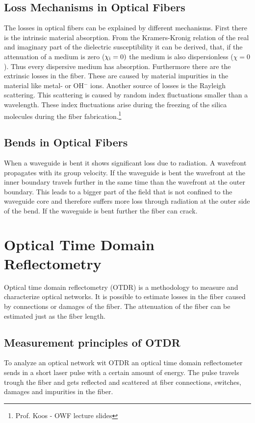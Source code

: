 \subsection{Loss Mechanisms in Optical Fibers}
\label{loss}
The losses in optical fibers can be explained by different mechanisms. First there is the intrinsic material absorption. From the Kramers-Kronig relation of the real and imaginary part of the dielectric susceptibility it can be derived, that, if the attenuation of a medium is zero ($\chi_{\mathrm{i}}=0)$ the medium is also dispersionless ($\chi=0$). Thus every dispersive medium has absorption. Furthermore there are the extrinsic losses in the fiber. These are caused by material impurities in the material like metal- or OH$^-$ ions. Another source of losses is the Rayleigh scattering. This scattering is caused by random index fluctuations smaller than a wavelength. These index fluctuations arise during the freezing of the silica molecules during the fiber fabrication.\footnote[1]{Prof. Koos - OWF lecture slides}

\subsection{Bends in Optical Fibers}

When a waveguide is bent it shows significant loss due to radiation. A wavefront propagates with its group velocity. If the waveguide is bent the wavefront at the inner boundary travels further in the same time than the wavefront at the outer boundary. This leads to a bigger part of the field that is not confined to the waveguide core and therefore suffers more loss through radiation at the outer side of the bend. If the waveguide is bent further the fiber can crack.\footnotemark[1]%


\section{Optical Time Domain Reflectometry}
Optical time domain reflectometry (OTDR) is a methodology to measure and characterize optical networks. It is possible to estimate losses in the fiber caused by connections or damages of the fiber. The attenuation of the fiber can be estimated just as the fiber length.

\subsection{Measurement principles of OTDR}
\label{subsec:Principle}
To analyze an optical network wit OTDR an optical time domain reflectometer sends in a short laser pulse with a certain amount of energy. The pulse travels trough the fiber and gets reflected and scattered at fiber connections, switches, damages and impurities in the fiber. 

